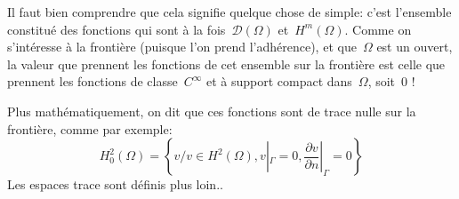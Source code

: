 \medskip
\begin{remarque}
Il faut bien comprendre que cela signifie quelque chose de simple: c'est l'ensemble constitué des fonctions qui sont à la fois~$\mathcal{D}(\Omega)$ et~$H^m(\Omega)$.
Comme on s'intéresse à la frontière (puisque l'on prend l'adhérence), et que~$\Omega$ est un ouvert, la valeur que prennent les fonctions de cet ensemble sur la frontière est celle que prennent les fonctions de classe~$C^\infty$ et à support compact dans~$\Omega$, soit~$0$ !
\end{remarque}

Plus mathématiquement, on dit que ces fonctions sont de trace nulle sur la frontière, comme par exemple:
\begin{equation}
  H_0^2(\Omega)=\left\{v / v\in H^2(\Omega), v|_\Gamma=0,
  \frac{\partial v}{\partial n}|_\Gamma=0\right\}
\end{equation}
Les espaces trace sont définis plus loin..
\medskipvm
{}


